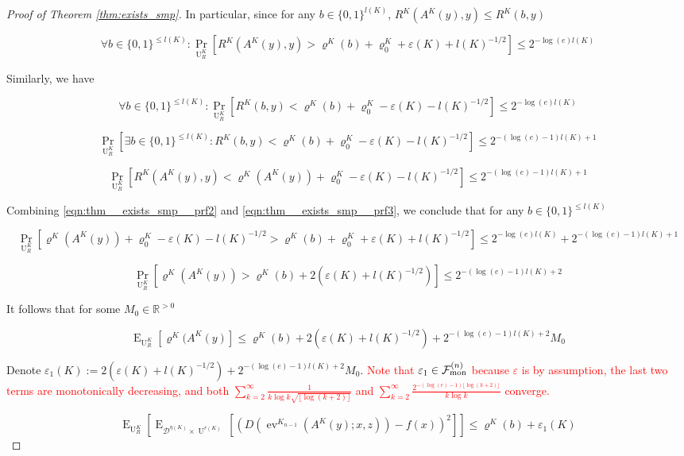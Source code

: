 \documentclass[11pt]{article}
\numberwithin{equation}{section}
\theoremstyle{definition}
\theoremstyle{plain}
\newcommand{\Bool}{\{0,1\}}
\DeclareMathOperator{\Prb}{Pr}
\DeclareMathOperator{\E}{E}
\DeclareMathOperator{\Ev}{ev}
\DeclareMathOperator{\Un}{U}
\newcommand{\Reals}{\mathbb{R}}
\newcommand{\Floor}[1]{\lfloor #1 \rfloor}
\newcommand{\Dist}{\mathcal{D}}
\newcommand{\Fall}{\mathcal{F}}
\newcommand{\FallM}{\Fall_{\textnormal{mon}}^{(n)}}
\begin{document}
\begin{proof}[Proof of Theorem \ref{thm:exists_smp}]
In particular, since for any ${b \in \Bool^{l(K)}}$, ${R^K(A^K(y),y) \leq R^K(b,y)}$

\begin{equation}
\label{eqn:thm__exists_smp__prf2}
\forall b \in \Bool^{\leq l(K)}: \Prb_{\Un_R^K}[R^K(A^K(y),y) > \varrho^K(b) + \varrho_0^K + \varepsilon(K) + l(K)^{-1/2}] \leq 2^{-\log(e) l(K)}
\end{equation}

Similarly, we have

\[\forall b \in \Bool^{\leq l(K)}: \Prb_{\Un_R^K}[R^K(b,y) < \varrho^K(b) + \varrho_0^K - \varepsilon(K) - l(K)^{-1/2}] \leq 2^{-\log(e) l(K)}\]

\[\Prb_{\Un_R^K}[\exists b \in \Bool^{\leq l(K)}: R^K(b,y) < \varrho^K(b) + \varrho_0^K - \varepsilon(K) - l(K)^{-1/2}] \leq 2^{-(\log(e)-1) l(K)+1}\]

\begin{equation}
\label{eqn:thm__exists_smp__prf3}
\Prb_{\Un_R^K}[R^K(A^K(y),y) < \varrho^K(A^K(y)) + \varrho_0^K - \varepsilon(K) - l(K)^{-1/2}] \leq 2^{-(\log(e)-1)l(K)+1}
\end{equation}

Combining \ref{eqn:thm__exists_smp__prf2} and \ref{eqn:thm__exists_smp__prf3}, we conclude that for any ${b \in \Bool^{\leq l(K)}}$

\[\Prb_{\Un_R^K}[\varrho^K(A^K(y)) + \varrho_0^K - \varepsilon(K) - l(K)^{-1/2} > \varrho^K(b) + \varrho_0^K + \varepsilon(K) + l(K)^{-1/2}] \leq 2^{-\log(e) l(K)} + 2^{-(\log(e)-1) l(K)+1}\]

\[\Prb_{\Un_R^K}[\varrho^K(A^K(y)) > \varrho^K(b) + 2(\varepsilon(K) + l(K)^{-1/2})] \leq 2^{-(\log(e)-1) l(K)+2}\]

It follows that for some ${M_0 \in \Reals^{>0}}$

\[\E_{\Un_R^K}[\varrho^K(A^K(y)] \leq \varrho^K(b) + 2(\varepsilon(K) + l(K)^{-1/2}) + 2^{-(\log(e)-1)l(K)+2} M_0\]

 Denote ${\varepsilon_1(K):=2(\varepsilon(K) + l(K)^{-1/2}) + 2^{-(\log(e)-1) l(K)+2} M_0}$. \textcolor{red}{Note that ${\varepsilon_1 \in \FallM}$ because $\varepsilon$ is by assumption, the last two terms are monotonically decreasing, and both $\sum_{k=2}^{\infty}\frac{1}{k\log k \sqrt{\Floor{\log(k+2)}}}$ and $\sum_{k=2}^{\infty}\frac{2^{-(\log(e)-1)\Floor{\log(k+2)}}}{k\log k}$ converge.}

\[\E_{\Un_R^K}[\E_{\Dist^{\eta(K)} \times \Un^{r(K)}}[(D(\Ev^{K_{n-1}}(A^K(y);x,z))-f(x))^2]] \leq \varrho^K(b) + \varepsilon_1(K)\]


\end{proof}
\end{document}
